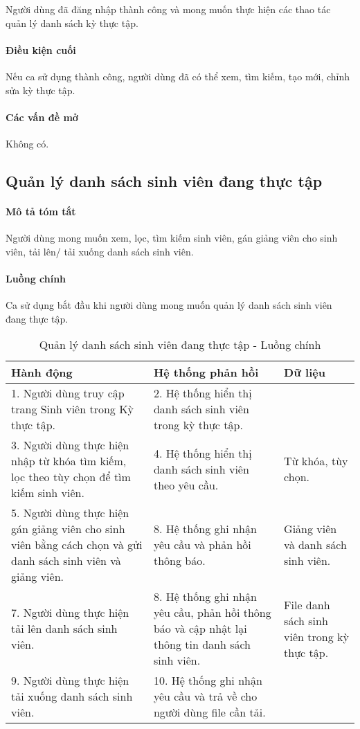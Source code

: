 \documentclass[./../main.tex]{subfiles}
\begin{document}
Người dùng đã đăng nhập thành công và mong muốn thực hiện các thao tác quản lý danh sách kỳ thực tập.

\paragraph*{Điều kiện cuối}

Nếu ca sử dụng thành công, người dùng đã có thể xem, tìm kiếm, tạo mới, chỉnh sửa kỳ thực tập.

\paragraph*{Các vấn đề mở}

Không có.

\subsection{Quản lý danh sách sinh viên đang thực tập}

\paragraph*{Mô tả tóm tắt}

Người dùng mong muốn xem, lọc, tìm kiếm sinh viên, gán giảng viên cho sinh viên, tải lên/ tải xuống danh sách sinh viên.

\paragraph*{Luồng chính} Ca sử dụng bắt đầu khi người dùng mong muốn quản lý danh sách sinh viên đang thực tập.

\begin{table}[H]
  \caption{Quản lý danh sách sinh viên đang thực tập - Luồng chính}
  \label{tab:orgAdmin_manage_internship_students}
  \begin{tabularx}{\textwidth}{|X|X|X|}
    \hline
\textbf{Hành động} & \textbf{Hệ thống phản hồi} & \textbf{Dữ liệu} \\ \hline
1. Người dùng truy cập trang Sinh viên trong Kỳ thực tập. & 2. Hệ thống hiển thị danh sách sinh viên trong kỳ thực tập. &  \\ \hline
3. Người dùng thực hiện nhập từ khóa tìm kiếm, lọc theo tùy chọn để tìm kiếm sinh viên. & 4. Hệ thống hiển thị danh sách sinh viên theo yêu cầu. & Từ khóa, tùy chọn. \\ \hline
5. Người dùng thực hiện gán giảng viên cho sinh viên bằng cách chọn và gửi danh sách sinh viên và giảng viên. & 8. Hệ thống ghi nhận yêu cầu và phản hồi thông báo. & Giảng viên và danh sách sinh viên. \\ \hline
7. Người dùng thực hiện tải lên danh sách sinh viên. & 8. Hệ thống ghi nhận yêu cầu, phản hồi thông báo và cập nhật lại thông tin danh sách sinh viên. & File danh sách sinh viên trong kỳ thực tập. \\ \hline
9. Người dùng thực hiện tải xuống danh sách sinh viên. & 10. Hệ thống ghi nhận yêu cầu và trả về cho người dùng file cần tải. &  \\ \hline
  \end{tabularx}
\end{table}
\end{document}
